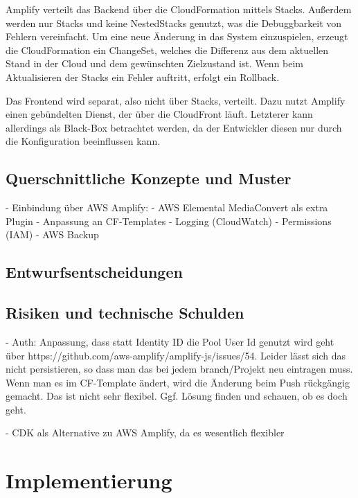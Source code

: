 Amplify verteilt das Backend über die CloudFormation mittels Stacks. Außerdem werden nur Stacks und keine NestedStacks genutzt, was die Debuggbarkeit von Fehlern vereinfacht. Um eine neue Änderung in das System einzuspielen, erzeugt die CloudFormation ein ChangeSet, welches die Differenz aus dem aktuellen Stand in der Cloud und dem gewünschten Zielzustand ist. Wenn beim Aktualisieren der Stacks ein Fehler auftritt, erfolgt ein Rollback.

Das Frontend wird separat, also nicht über Stacks, verteilt. Dazu nutzt Amplify einen gebündelten Dienst, der über die CloudFront läuft. Letzterer kann allerdings als Black-Box betrachtet werden, da der Entwickler diesen nur durch die Konfiguration beeinflussen kann.

\subsection{Querschnittliche Konzepte und Muster}

- Einbindung über \ac{AWS} Amplify:
  - AWS Elemental MediaConvert als extra Plugin
  - Anpassung an CF-Templates
- Logging (CloudWatch)
- Permissions (IAM)
- AWS Backup

\subsection{Entwurfsentscheidungen}

\subsection{Risiken und technische Schulden}

- Auth: Anpassung, dass statt Identity ID die Pool User Id genutzt wird geht über https://github.com/aws-amplify/amplify-js/issues/54. Leider lässt sich das nicht persistieren, so dass man das bei jedem branch/Projekt neu eintragen muss. Wenn man es im CF-Template ändert, wird die Änderung beim Push rückgängig gemacht. Das ist nicht sehr flexibel. Ggf. Lösung finden und schauen, ob es doch geht.

- CDK als Alternative zu AWS Amplify, da es wesentlich flexibler

\section{Implementierung}